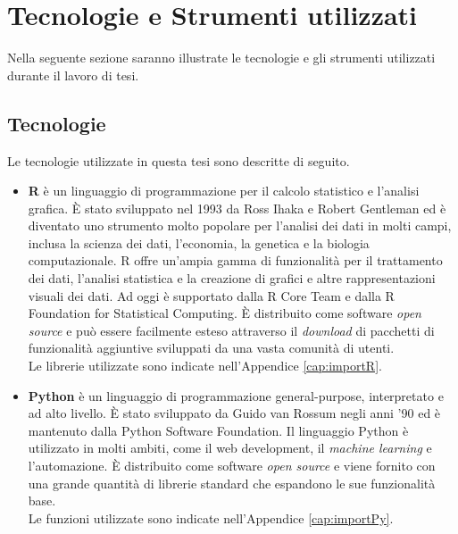 \section{Tecnologie e Strumenti utilizzati}
Nella seguente sezione saranno illustrate le tecnologie e gli strumenti utilizzati durante il lavoro di tesi. 
\subsection{Tecnologie}
Le tecnologie utilizzate in questa tesi sono descritte di seguito.
\begin{itemize}
	\item \textbf{R} \autocite{R-language} è un linguaggio di programmazione per il calcolo statistico e l'analisi grafica. È stato sviluppato nel 1993 da Ross Ihaka e Robert Gentleman ed è diventato uno strumento molto popolare per l'analisi dei dati in molti campi, inclusa la scienza dei dati, l'economia, la genetica e la biologia computazionale. R offre un'ampia gamma di funzionalità per il trattamento dei dati, l'analisi statistica e la creazione di grafici e altre rappresentazioni visuali dei dati. Ad oggi è supportato dalla R Core Team e dalla R Foundation for Statistical Computing. È distribuito come software \emph{open source} e può essere facilmente esteso attraverso il \emph{download} di pacchetti di funzionalità aggiuntive sviluppati da una vasta comunità di utenti.\\
	Le librerie utilizzate sono indicate nell'Appendice \ref{cap:importR}.
	\item \textbf{Python} \autocite{van2003introduction} è un linguaggio di programmazione general-purpose, interpretato e ad alto livello. È stato sviluppato da Guido van Rossum negli anni '90 ed è mantenuto dalla Python Software Foundation. Il linguaggio Python è utilizzato in molti ambiti, come il web development, il \emph{machine learning} e l'automazione. È distribuito come software \emph{open source} e viene fornito con una grande quantità di librerie standard che espandono le sue funzionalità base.\\
	Le funzioni utilizzate sono indicate nell'Appendice \ref{cap:importPy}.
\end{itemize}


\begin{comment}
library(ggmosaic)
library(ggplot2)
library(gridExtra)
@article{marchiori2020secrets,
	title={Secrets of soccer: Neural network flows and game performance},
	author={Marchiori, Massimo and de Vecchi, Marco},
	journal={Computers \& Electrical Engineering},
	volume={81},
	pages={106505},
	year={2020},
	publisher={Elsevier}
}
\end{comment}

